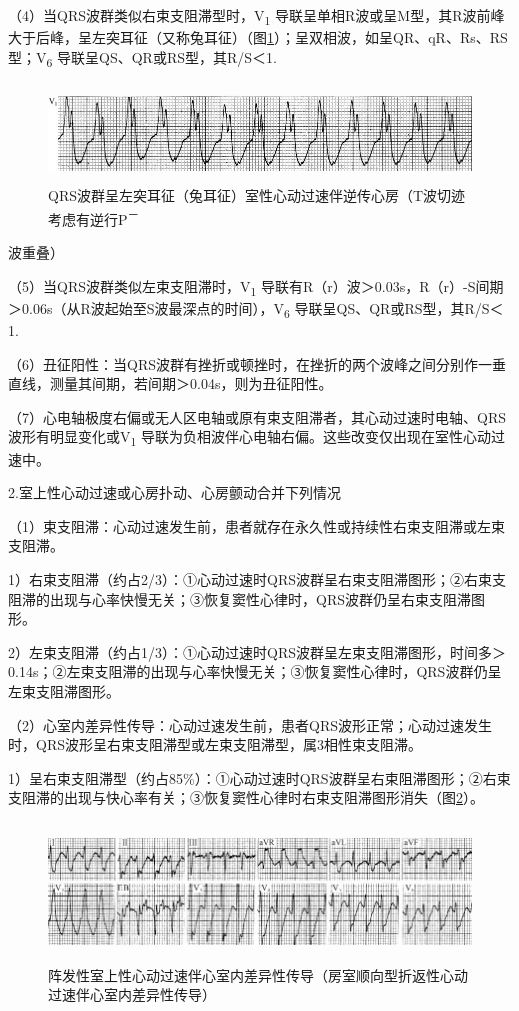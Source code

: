 （4）当QRS波群类似右束支阻滞型时，V\textsubscript{1}
导联呈单相R波或呈M型，其R波前峰大于后峰，呈左突耳征（又称兔耳征）（图\ref{fig31-4}）；呈双相波，如呈QR、qR、Rs、RS型；V\textsubscript{6}
导联呈QS、QR或RS型，其R/S＜1.

\begin{figure}[!htbp]
 \centering
 \includegraphics[width=5.71875in,height=1.02083in]{./images/Image00507.jpg}
 \captionsetup{justification=centering}
 \caption{QRS波群呈左突耳征（兔耳征）室性心动过速伴逆传心房（T波切迹考虑有逆行P\textsuperscript{－}}
 \label{fig31-4}
  \end{figure} 
波重叠）

（5）当QRS波群类似左束支阻滞时，V\textsubscript{1}
导联有R（r）波＞0.03s，R（r）-S间期＞0.06s（从R波起始至S波最深点的时间），V\textsubscript{6}
导联呈QS、QR或RS型，其R/S＜1.

（6）丑征阳性：当QRS波群有挫折或顿挫时，在挫折的两个波峰之间分别作一垂直线，测量其间期，若间期＞0.04s，则为丑征阳性。

（7）心电轴极度右偏或无人区电轴或原有束支阻滞者，其心动过速时电轴、QRS波形有明显变化或V\textsubscript{1}
导联为负相波伴心电轴右偏。这些改变仅出现在室性心动过速中。

2.室上性心动过速或心房扑动、心房颤动合并下列情况

（1）束支阻滞：心动过速发生前，患者就存在永久性或持续性右束支阻滞或左束支阻滞。

1）右束支阻滞（约占2/3）：①心动过速时QRS波群呈右束支阻滞图形；②右束支阻滞的出现与心率快慢无关；③恢复窦性心律时，QRS波群仍呈右束支阻滞图形。

2）左束支阻滞（约占1/3）：①心动过速时QRS波群呈左束支阻滞图形，时间多＞0.14s；②左束支阻滞的出现与心率快慢无关；③恢复窦性心律时，QRS波群仍呈左束支阻滞图形。

（2）心室内差异性传导：心动过速发生前，患者QRS波形正常；心动过速发生时，QRS波形呈右束支阻滞型或左束支阻滞型，属3相性束支阻滞。

1）呈右束支阻滞型（约占85\%）：①心动过速时QRS波群呈右束阻滞图形；②右束支阻滞的出现与快心率有关；③恢复窦性心律时右束支阻滞图形消失（图\ref{fig31-5}）。

\begin{figure}[!htbp]
 \centering
 \includegraphics[width=5.78125in,height=1.44792in]{./images/Image00508.jpg}
 \captionsetup{justification=centering}
 \caption{阵发性室上性心动过速伴心室内差异性传导（房室顺向型折返性心动过速伴心室内差异性传导）}
 \label{fig31-5}
  \end{figure} 

